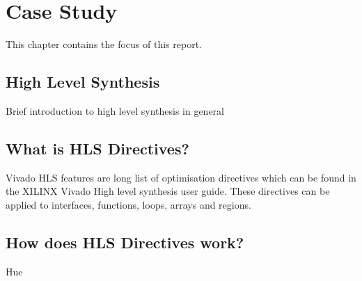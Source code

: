 \chapter{Case Study}
This chapter contains the focus of this report.

\section{High Level Synthesis}
Brief introduction to high level synthesis in general

\section{What is HLS Directives?}
Vivado HLS features are long list of optimisation directives which can be found in the XILINX Vivado High level synthesis user guide. These directives can be applied to interfaces, functions, loops, arrays and regions. 


\section{How does HLS Directives work?}
Hue
